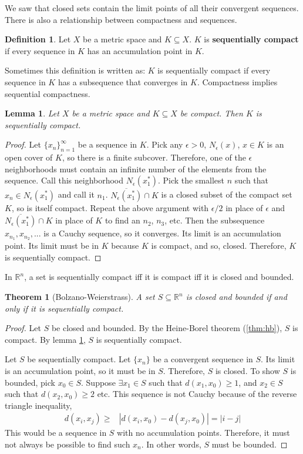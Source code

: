 \documentclass[12pt,reqno]{amsart}
\newtheorem{theorem}{Theorem}[section]
\newtheorem{lemma}{Lemma}[section]
\theoremstyle{definition}
\newtheorem{definition}{Definition}[section]
\def\R{\mathbb{R}}
\newcommand{\abs}[1]{\left\vert {#1} \right\vert}
\newcommand{\seq}[1]{\{{#1}_n \}_{n=1}^\infty }
\begin{document}
We saw that closed sets contain the limit points of all their
convergent sequences. There is also a relationship between compactness
and sequences. 
\begin{definition}
  Let $X$ be a metric space and $K \subseteq X$. $K$ is
  \textbf{sequentially compact} if every sequence in $K$ has an
  accumulation point in $K$.
\end{definition}
Sometimes this definition is written as: $K$ is sequentially compact
if every sequence in $K$ has a subsequence that converges in
$K$. Compactness implies sequential compactness. 
\begin{lemma}\label{lem:compactSeqCompact}
    Let $X$ be a metric space and $K \subseteq X$ be compact. Then $K$
    is sequentially compact. 
\end{lemma}
\begin{proof}
  Let $\seq{x}$ be a sequence in
  $K$. Pick any $\epsilon>0$, $N_\epsilon(x)$, $x \in K$ is an open
  cover of $K$, so there is a finite subcover. Therefore, one of the
  $\epsilon$ neighborhoods must contain an infinite number of the
  elements from the sequence. Call this neighborhood
  $N_\epsilon(x_1^\ast)$. Pick the smallest $n$ such that $x_n \in
  N_\epsilon(x_1^\ast)$ and call it $n_1$. $\overline{N_{\epsilon}(x_1^\ast)}
  \cap K$ is a closed subset of the compact set $K$, so is itself
  compact. Repeat the above argument with $\epsilon/2$ in place of
  $\epsilon$ and $\overline{N_{\epsilon}(x_1^\ast)} \cap K$ in place of $K$
  to find an $n_2$, $n_3$, etc. Then the subsequence $x_{n_1},
  x_{n_2}, ...$ is a Cauchy sequence, so it converges. Its limit is an
  accumulation point. Its limit must be in $K$ because $K$ is compact,
  and so, closed. Therefore, $K$ is sequentially compact.
\end{proof}

In $\R^n$, a set is sequentially compact iff it is compact iff it is
closed and bounded.
\begin{theorem}[Bolzano-Weierstrass] \label{thm:bw}
  A set $S \subseteq \R^n$ is closed and bounded if and only if it is
  sequentially compact. 
\end{theorem}
\begin{proof}
  Let $S$ be closed and bounded. By the Heine-Borel theorem
  (\ref{thm:hb}), $S$ is compact. By lemma
  \ref{lem:compactSeqCompact}, $S$ is sequentially compact. 

  Let $S$ be sequentially compact. Let $\{x_n\}$ be a convergent
  sequence in $S$. Its limit is an accumulation point, so it must be
  in $S$. Therefore, $S$ is closed. To show $S$ is bounded, pick $x_0
  \in S$. Suppose $\exists x_1 \in S$ such that $d(x_1, x_0) \geq 1$,
  and $x_2 \in S$ such that $d(x_2, x_0) \geq 2$ etc. This sequence is
  not Cauchy because of the reverse triangle inequality,  
  \begin{align*}
    d(x_i,x_j) \geq & \abs{d(x_i,x_0) - d(x_j,x_0) } = |i-j|
  \end{align*}  
  This would be a sequence in $S$ with no accumulation
  points. Therefore, it must not always be possible to find such
  $x_n$. In other words, $S$ must be bounded.
\end{proof}
\end{document}

